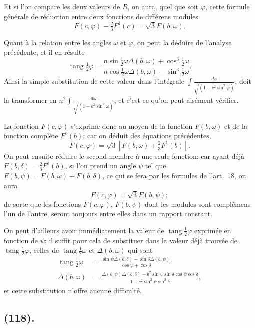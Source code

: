 \documentclass{article}
\begin{document}
Et si l'on compare les deux valeurs de $R$, on aura, quel que soit $\varphi$, cette formule générale de réduction entre deux fonctions de différens modules
\[ F(c,\varphi)-\tfrac{2}{3}F^{1}(c)=\sqrt{3}F(b,\omega). \]


Quant à la relation entre les angles $\omega$ et $\varphi$, on peut la déduire de l'analyse précédente, et il en résulte
\[ \operatorname{tang}\tfrac{1}{2}\varphi=\frac{n\sin\tfrac{1}{2}\omega\Delta(b,\omega)+\cos^{3}\tfrac{1}{2}\omega}{n\cos\tfrac{1}{2}\omega\Delta(b,\omega)-\sin^{3}\tfrac{1}{2}\omega}. \]
Ainsi la simple substitution de cette valeur dans l'intégrale $\displaystyle\int\frac{d\varphi}{\sqrt{(1-c^{2}\sin^{2}\varphi)}}$, doit la transformer en $n^{2}\displaystyle\int\frac{d\omega}{\sqrt{(1-b^{2}\sin^{3}\omega)}}$, et c'est ce qu'on peut aisément vérifier.

La fonction $F(c,\varphi)$ s'exprime donc au moyen de la fonction $F(b,\omega)$ et de la fonction complète $F^{1}(b)$; car on déduit des équations précédentes,
\[ F(c,\varphi)=\sqrt{3}[F(b,\omega)+\tfrac{2}{3}F^{1}(b)]. \]
On peut ensuite réduire le second membre à une seule fonction; car ayant déjà $F(b,\delta)=\frac{2}{3}F^{1}(b)$, si l'on prend un angle $\psi$ tel que $F(b,\psi)=F(b,\omega)+F(b,\delta)$, ce qui se fera par les formules de l'art.\ 18, on aura
\[ F(c,\varphi)=\sqrt{3}F(b,\psi); \]
de sorte que les fonctions $F(c,\varphi)$, $F(b,\psi)$ dont les modules sont complémens l'un de l'autre, seront toujours entre elles dans un rapport constant.

On peut d'ailleurs avoir immédiatement la valeur de $\operatorname{tang}\frac{1}{2}\varphi$ exprimée en fonction de $\psi$; il suffit pour cela de substituer dans la valeur déjà trouvée de $\operatorname{tang}\frac{1}{2}\varphi$, celles de $\operatorname{tang}\frac{1}{2}\omega$ et $\Delta(b,\omega)$ qui sont
\[ \begin{aligned} \operatorname{tang}\tfrac{1}{2}\omega&=\frac{\sin\psi\Delta(b,\delta)-\sin\delta\Delta(b,\psi)}{\cos\psi+\cos\delta}\\ \Delta(b,\omega)&=\frac{\Delta(b,\psi)\Delta(b,\delta)+b^{2}\sin\psi\sin\delta\cos\psi\cos\delta}{1-c^{2}\sin^{2}\psi\sin^{2}\delta}, \end{aligned} \]
et cette substitution n'offre aucune difficulté.

\subsection*{(118).}
\end{document}

